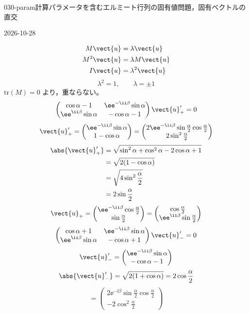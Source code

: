 \documentclass[uplatex,dvipdfmx,a4paper,11pt]{jsarticle}
\begin{document}
\begin{mondai}{030-param}{計算}{パラメータを含むエルミート行列の固有値問題，固有ベクトルの直交}
\begin{kotaeutsushi}{2026-10-28}
\begin{align*}
\end{align*}
\begin{align*}
M\vect{u}&=\lambda\vect{u}\\
M^{2}\vect{u}&=\lambda M\vect{u}\\
I\vect{u}&=\lambda^{2}\vect{u}
\end{align*}
\[ \lambda^{2}=1,\qquad \lambda=\pm1 \]
$\mathrm{tr}(M)=0$ より，重ならない。
\[ \begin{pmatrix}\cos\alpha-1 & \ee^{-\ii\beta}\sin\alpha\\ \ee^{\ii\beta}\sin\alpha & -\cos\alpha-1\end{pmatrix}\vect{u}_{+}'=0 \]
\[ \vect{u}_{+}'=\begin{pmatrix}\ee^{-\ii\beta}\sin\alpha\\ 1-\cos\alpha\end{pmatrix}=\begin{pmatrix}2\ee^{-\ii\beta}\sin\frac{\alpha}{2}\cos\frac{\alpha}{2}\\ 2\sin^{2}\frac{\alpha}{2}\end{pmatrix} \]
\begin{align*}
\abs{\vect{u}_{+}'}&=\sqrt{\sin^{2}\alpha+\cos^{2}\alpha-2\cos\alpha+1}\\
&=\sqrt{2(1-\cos\alpha)}\\
&=\sqrt{4\sin^{2}\frac{\alpha}{2}}\\
&=2\sin\frac{\alpha}{2}
\end{align*}
\[ \vect{u}_{+}=\begin{pmatrix}\ee^{-\ii\beta}\cos\frac{\alpha}{2}\\ \sin\frac{\alpha}{2}\end{pmatrix}=\begin{pmatrix}\cos\frac{\alpha}{2}\\ \ee^{\ii\beta}\sin\frac{\alpha}{2}\end{pmatrix} \]
\[ \begin{pmatrix}\cos\alpha+1 & \ee^{-\ii\beta}\sin\alpha\\ \ee^{\ii\beta}\sin\alpha & -\cos\alpha+1\end{pmatrix}\vect{u}_{-}'=0 \]
\[ \vect{u}_{-}'=\begin{pmatrix}\ee^{-\ii\beta}\sin\alpha\\ -\cos\alpha-1\end{pmatrix} \]
\[ \abs{\vect{u}_{-}'}=\sqrt{2(1+\cos\alpha)}=2\cos\frac{\alpha}{2} \]
\[ =\begin{pmatrix}2\ee^{-\ii\beta}\sin\frac{\alpha}{2}\cos\frac{\alpha}{2}\\ -2\cos^{2}\frac{\alpha}{2}\end{pmatrix} \]

\end{kotaeutsushi}
\end{mondai}
\end{document}
